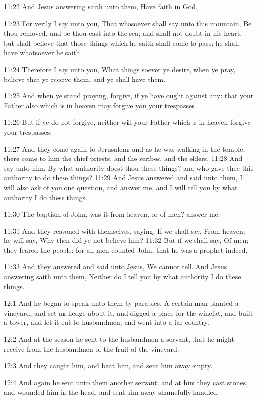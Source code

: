 11:22 And Jesus answering saith unto them, Have faith in God.

11:23 For verily I say unto you, That whosoever shall say unto this mountain, Be thou removed, and be thou cast into the sea; and shall not doubt in his heart, but shall believe that those things which he saith shall come to pass; he shall have whatsoever he saith.

11:24 Therefore I say unto you, What things soever ye desire, when ye pray, believe that ye receive them, and ye shall have them.

11:25 And when ye stand praying, forgive, if ye have ought against any: that your Father also which is in heaven may forgive you your trespasses.

11:26 But if ye do not forgive, neither will your Father which is in heaven forgive your trespasses.

11:27 And they come again to Jerusalem: and as he was walking in the temple, there come to him the chief priests, and the scribes, and the elders, 11:28 And say unto him, By what authority doest thou these things? and who gave thee this authority to do these things?  11:29 And Jesus answered and said unto them, I will also ask of you one question, and answer me, and I will tell you by what authority I do these things.

11:30 The baptism of John, was it from heaven, or of men? answer me.

11:31 And they reasoned with themselves, saying, If we shall say, From heaven; he will say, Why then did ye not believe him?  11:32 But if we shall say, Of men; they feared the people: for all men counted John, that he was a prophet indeed.

11:33 And they answered and said unto Jesus, We cannot tell. And Jesus answering saith unto them, Neither do I tell you by what authority I do these things.

12:1 And he began to speak unto them by parables. A certain man planted a vineyard, and set an hedge about it, and digged a place for the winefat, and built a tower, and let it out to husbandmen, and went into a far country.

12:2 And at the season he sent to the husbandmen a servant, that he might receive from the husbandmen of the fruit of the vineyard.

12:3 And they caught him, and beat him, and sent him away empty.

12:4 And again he sent unto them another servant; and at him they cast stones, and wounded him in the head, and sent him away shamefully handled.

